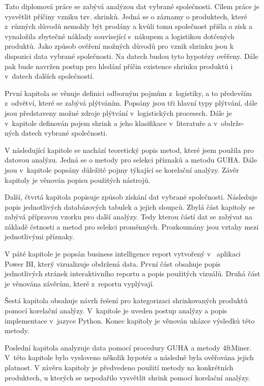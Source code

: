 Tato diplomová práce se zabývá analýzou dat vybrané společnosti. Cílem práce je vysvětlit příčiny vzniku tzv. shrinků. Jedná se o záznamy o produktech, které z~různých důvodů nemohly být prodány a kvůli tomu společnost přišla o zisk a vynaložila zbytečné náklady související s~nákupem a logistikou dotčených produktů. 
Jako způsob ověření možných důvodů pro vznik shrinku jsou k dispozici data vybrané společnosti. Na datech budou tyto hypotézy ověřeny. Dále pak bude navržen postup 
 pro hledání příčin existence shrinku produktů i v~datech dalších společností. 


První kapitola se věnuje definici odborným pojmům z~logistiky, a to především z~odvětví, které se zabývá plýtváním. Popsány jsou tři hlavní typy plýtvání, dále jsou představeny možné zdroje plýtvání v~logistických procesech. Dále je v~kapitole definován pojem shrink a jeho klasifikace v~literatuře a v~obdrže-\\ných datech vybrané společnosti.


V následující kapitole se nachází teoretický popis metod, které jsem použila pro datovou analýzu. Jedná se o metody pro selekci příznaků a metodu GUHA. Dále jsou v~kapitole popsány důležité pojmy týkající se korelační analýzy. Závěr kapitoly je věnován popisu použitých nástrojů.


Další, čtvrtá kapitola popisuje způsob získání dat vybrané společnosti. Následuje popis jednotlivých databázových tabulek a jejich sloupců. Zbylá část kapitoly se zabývá přípravou vzorku pro další analýzy. Tedy kterou částí dat se zabývat na základě četnosti a metod pro selekci proměnných. Prozkoumány jsou vztahy mezi jednotlivými příznaky.

V páté kapitole je popsán business intelligence report vytvořený v~ aplikaci Power BI, který vizualizuje obdržená data. První část obsahuje popis jednotlivých stránek interaktivního reportu a popis použitých vizuálů. Druhá část je věnována závěrům, které z~reportu vyplývají.

Šestá kapitola obsahuje návrh řešení pro kategorizaci shrinkovaných produktů pomocí korelační analýzy. V~kapitole je uveden postup analýzy a popis implementace v~jazyce Python. Konec kapitoly je věnován ukázce výsledků této metody.

Poslední kapitola analyzuje data pomocí procedury GUHA a metody 4ftMiner. V~této kapitole bylo vysloveno několik hypotéz a následně byla ověřována jejich platnost. V závěru kapitoly je předvedeno použití metody na konkrétních produktech, u kterých se nepodařilo vysvětlit shrink pomocí korelační analýzy.







